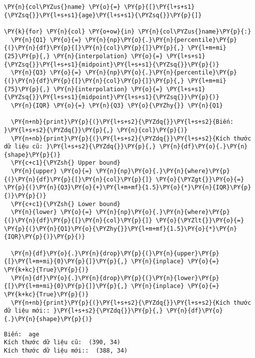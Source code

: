     \begin{tcolorbox}[breakable, size=fbox, boxrule=1pt, pad at break*=1mm,colback=cellbackground, colframe=cellborder]
\begin{Verbatim}[commandchars=\\\{\}]
\PY{n}{col\PYZus{}name} \PY{o}{=} \PY{p}{[}\PY{l+s+s1}{\PYZsq{}}\PY{l+s+s1}{age}\PY{l+s+s1}{\PYZsq{}}\PY{p}{]}

\PY{k}{for} \PY{n}{col} \PY{o+ow}{in} \PY{n}{col\PYZus{}name}\PY{p}{:}
  \PY{n}{Q1} \PY{o}{=} \PY{n}{np}\PY{o}{.}\PY{n}{percentile}\PY{p}{(}\PY{n}{df}\PY{p}{[}\PY{n}{col}\PY{p}{]}\PY{p}{,} \PY{l+m+mi}{25}\PY{p}{,} \PY{n}{interpolation} \PY{o}{=} \PY{l+s+s1}{\PYZsq{}}\PY{l+s+s1}{midpoint}\PY{l+s+s1}{\PYZsq{}}\PY{p}{)}
  \PY{n}{Q3} \PY{o}{=} \PY{n}{np}\PY{o}{.}\PY{n}{percentile}\PY{p}{(}\PY{n}{df}\PY{p}{[}\PY{n}{col}\PY{p}{]}\PY{p}{,} \PY{l+m+mi}{75}\PY{p}{,} \PY{n}{interpolation} \PY{o}{=} \PY{l+s+s1}{\PYZsq{}}\PY{l+s+s1}{midpoint}\PY{l+s+s1}{\PYZsq{}}\PY{p}{)}
  \PY{n}{IQR} \PY{o}{=} \PY{n}{Q3} \PY{o}{\PYZhy{}} \PY{n}{Q1}

  \PY{n+nb}{print}\PY{p}{(}\PY{l+s+s2}{\PYZdq{}}\PY{l+s+s2}{Biến: }\PY{l+s+s2}{\PYZdq{}}\PY{p}{,} \PY{n}{col}\PY{p}{)}
  \PY{n+nb}{print}\PY{p}{(}\PY{l+s+s2}{\PYZdq{}}\PY{l+s+s2}{Kích thước dữ liệu cũ: }\PY{l+s+s2}{\PYZdq{}}\PY{p}{,} \PY{n}{df}\PY{o}{.}\PY{n}{shape}\PY{p}{)}
  \PY{c+c1}{\PYZsh{} Upper bound}
  \PY{n}{upper} \PY{o}{=} \PY{n}{np}\PY{o}{.}\PY{n}{where}\PY{p}{(}\PY{n}{df}\PY{p}{[}\PY{n}{col}\PY{p}{]} \PY{o}{\PYZgt{}}\PY{o}{=} \PY{p}{(}\PY{n}{Q3}\PY{o}{+}\PY{l+m+mf}{1.5}\PY{o}{*}\PY{n}{IQR}\PY{p}{)}\PY{p}{)}
  \PY{c+c1}{\PYZsh{} Lower bound}
  \PY{n}{lower} \PY{o}{=} \PY{n}{np}\PY{o}{.}\PY{n}{where}\PY{p}{(}\PY{n}{df}\PY{p}{[}\PY{n}{col}\PY{p}{]} \PY{o}{\PYZlt{}}\PY{o}{=} \PY{p}{(}\PY{n}{Q1}\PY{o}{\PYZhy{}}\PY{l+m+mf}{1.5}\PY{o}{*}\PY{n}{IQR}\PY{p}{)}\PY{p}{)}

  \PY{n}{df}\PY{o}{.}\PY{n}{drop}\PY{p}{(}\PY{n}{upper}\PY{p}{[}\PY{l+m+mi}{0}\PY{p}{]}\PY{p}{,} \PY{n}{inplace} \PY{o}{=} \PY{k+kc}{True}\PY{p}{)}
  \PY{n}{df}\PY{o}{.}\PY{n}{drop}\PY{p}{(}\PY{n}{lower}\PY{p}{[}\PY{l+m+mi}{0}\PY{p}{]}\PY{p}{,} \PY{n}{inplace} \PY{o}{=} \PY{k+kc}{True}\PY{p}{)}
  \PY{n+nb}{print}\PY{p}{(}\PY{l+s+s2}{\PYZdq{}}\PY{l+s+s2}{Kích thước dữ liệu mới:: }\PY{l+s+s2}{\PYZdq{}}\PY{p}{,} \PY{n}{df}\PY{o}{.}\PY{n}{shape}\PY{p}{)}
\end{Verbatim}
\end{tcolorbox}

    \begin{Verbatim}[commandchars=\\\{\}]
Biến:  age
Kích thước dữ liệu cũ:  (390, 34)
Kích thước dữ liệu mới::  (388, 34)
    \end{Verbatim}

